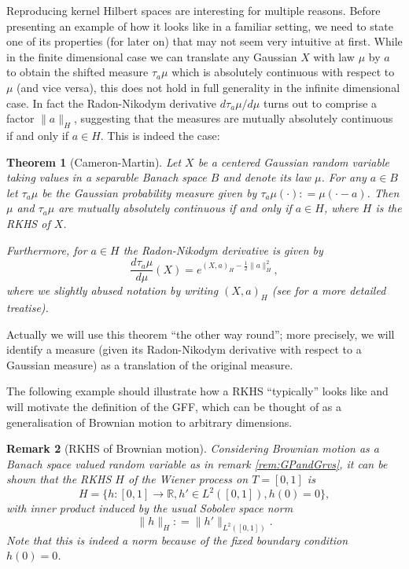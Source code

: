 \documentclass[11pt,reqno]{amsart}
\numberwithin{equation}{section}
\newtheorem{thm}{Theorem}[section]
\newtheorem{rem}[thm]{Remark}
\newcommand{\deq}{\mathrel{\mathop:}=}
\begin{document}
Reproducing kernel Hilbert spaces are interesting for multiple reasons. Before presenting an example of how it looks like in a familiar setting, we need to state one of its properties (for later on) that may not seem very intuitive at first. While in the finite dimensional case we can translate any Gaussian $X$ with law $\mu$ by $a$ to obtain the shifted measure $\tau_a\mu$ which is absolutely continuous with respect to $\mu$ (and vice versa), this does not hold in full generality in the infinite dimensional case. In fact the Radon-Nikodym derivative $d\tau_a\mu/d\mu$ turns out to comprise a factor $\|a\|_H$, suggesting that the measures are mutually absolutely continuous if and only if $a\in H$. This is indeed the case:

\begin{thm}[Cameron-Martin]\label{thm:CameronMartin}
	Let $X$ be a centered Gaussian random variable taking values in a separable Banach space $B$ and denote its law $\mu$. For any $a\in B$ let $\tau_a\mu$ be the Gaussian probability measure given by $\tau_a\mu(\cdot)\deq\mu(\cdot-a)$. Then $\mu$ and $\tau_a\mu$ are mutually absolutely continuous if and only if $a\in H$, where $H$ is the RKHS of $X$.
	
	Furthermore, for $a\in H$ the Radon-Nikodym derivative is given by $$\frac{d\tau_a\mu}{d\mu}(X)=e^{(X,a)_H-\frac{1}{2}\|a\|_H^2},$$
	where we slightly abused notation by writing $(X,a)_H$ (see \cite{Nickl} for a more detailed treatise).
\end{thm}

Actually we will use this theorem ``the other way round''; more precisely, we will identify a measure (given its Radon-Nikodym derivative with respect to a Gaussian measure) as a translation of the original measure.

The following example should illustrate how a RKHS ``typically'' looks like and will motivate the definition of the GFF, which can be thought of as a generalisation of Brownian motion to arbitrary dimensions.

\begin{rem}[RKHS of Brownian motion]\label{rem:RKHSofBM}
	Considering Brownian motion as a Banach space valued random variable as in remark \ref{rem:GPandGrvs}, it can be shown that the RKHS $H$ of the Wiener process on $T=[0,1]$ is $$H = \{h:[0,1]\rightarrow\mathbb R, h'\in L^2([0,1]), h(0)=0\},$$ with inner product induced by the usual Sobolev space norm $$\|h\|_H\deq \|h'\|_{L^2([0,1])}.$$
	Note that this is indeed a norm because of the fixed boundary condition $h(0)=0$.
\end{rem}
\end{document}
